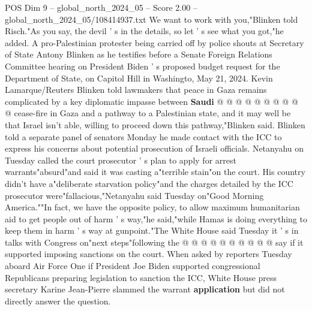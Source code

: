 \begin{textsample}{POS Dim 9 – global\_north\_2024\_05 – Score 2.00 – global\_north\_2024\_05/108414937.txt}
We want to work with you,"Blinken told Risch."As you say, the devil ' s in the details, so let ' s see what you got,"he added.
A pro-Palestinian protester being carried off by police shouts at Secretary of State Antony Blinken as he testifies before a Senate Foreign Relations Committee hearing on President Biden ' s proposed budget request for the Department of State, on Capitol Hill in Washingto, May 21, 2024.
Kevin Lamarque/Reuters Blinken told lawmakers that peace in Gaza remains complicated by a key diplomatic impasse between \textbf{Saudi} @ @ @ @ @ @ @ @ @ @ cease-fire in Gaza and a pathway to a Palestinian state, and it may well be that Israel isn't able, willing to proceed down this pathway,"Blinken said.
Blinken told a separate panel of senators Monday he made contact with the ICC to express his concerns about potential prosecution of Israeli officials.
Netanyahu on Tuesday called the court prosecutor ' s plan to apply for arrest warrants"absurd"and said it was casting a"terrible stain"on the court.
His country didn't have a"deliberate starvation policy"and the charges detailed by the ICC prosecutor were"fallacious,"Netanyahu said Tuesday on"Good Morning America.""In fact, we have the opposite policy, to allow maximum humanitarian aid to get people out of harm ' s way,"he said,"while Hamas is doing everything to keep them in harm ' s way at gunpoint."The White House said Tuesday it ' s in talks with Congress on"next steps"following the @ @ @ @ @ @ @ @ @ @ say if it supported imposing sanctions on the court.
When asked by reporters Tuesday aboard Air Force One if President Joe Biden supported congressional Republicans preparing legislation to sanction the ICC, White House press secretary Karine Jean-Pierre slammed the warrant \textbf{application} but did not directly answer the question.

\end{textsample}

